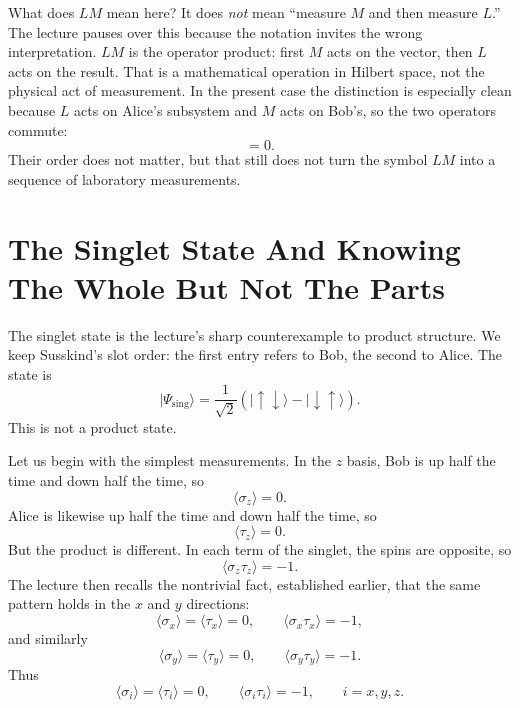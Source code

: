 What does $LM$ mean here? It does \emph{not} mean ``measure $M$ and then measure $L$.'' The lecture pauses over this because the notation invites the wrong interpretation. $LM$ is the operator product: first $M$ acts on the vector, then $L$ acts on the result. That is a mathematical operation in Hilbert space, not the physical act of measurement. In the present case the distinction is especially clean because $L$ acts on Alice's subsystem and $M$ acts on Bob's, so the two operators commute:
\begin{equation}
[L,M]=0.
\end{equation}
Their order does not matter, but that still does not turn the symbol $LM$ into a sequence of laboratory measurements.

\section{The Singlet State And Knowing The Whole But Not The Parts}

The singlet state is the lecture's sharp counterexample to product structure. We keep Susskind's slot order: the first entry refers to Bob, the second to Alice. The state is
\begin{equation}
|\Psi_{\mathrm{sing}}\rangle
=
\frac{1}{\sqrt2}
\left(
|\uparrow\downarrow\rangle
-
|\downarrow\uparrow\rangle
\right).
\end{equation}
This is not a product state.

Let us begin with the simplest measurements. In the $z$ basis, Bob is up half the time and down half the time, so
\begin{equation}
\langle \sigma_z\rangle=0.
\end{equation}
Alice is likewise up half the time and down half the time, so
\begin{equation}
\langle \tau_z\rangle=0.
\end{equation}
But the product is different. In each term of the singlet, the spins are opposite, so
\begin{equation}
\langle \sigma_z\tau_z\rangle=-1.
\end{equation}
The lecture then recalls the nontrivial fact, established earlier, that the same pattern holds in the $x$ and $y$ directions:
\begin{equation}
\langle \sigma_x\rangle=\langle \tau_x\rangle=0,
\qquad
\langle \sigma_x\tau_x\rangle=-1,
\end{equation}
and similarly
\begin{equation}
\langle \sigma_y\rangle=\langle \tau_y\rangle=0,
\qquad
\langle \sigma_y\tau_y\rangle=-1.
\end{equation}
Thus
\begin{equation}
\langle \sigma_i\rangle=\langle \tau_i\rangle=0,
\qquad
\langle \sigma_i\tau_i\rangle=-1,
\qquad
i=x,y,z.
\end{equation}

